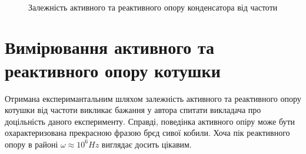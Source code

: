 \begin{figure}[h]
\begin{minipage}[h]{0.47\linewidth}
    \end{minipage}
    \vfill
    \begin{minipage}[h]{0.47\linewidth}
        \\
    \end{minipage}
    \caption{Залежність активного та реактивного опору конденсатора від частоти}
    \label{fig:part22}
\end{figure}

\section{Вимірювання активного та реактивного опору котушки}

Отримана експеримантальним шляхом залежність активного та реактивного опору котушки від частоти викликає бажання у автора спитати викладача про доцільність даного експерименту. Справді, поведінка активного опіру може бути охарактеризована прекрасною фразою брєд сивої кобили. Хоча пік реактивного опору в районі $\omega \approx 10^6 Hz$ виглядає досить цікавим.

